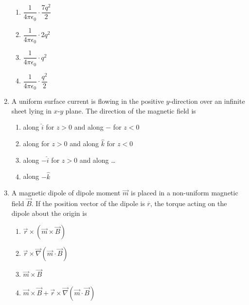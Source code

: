 \documentclass[journal,12pt,onecolumn]{IEEEtran}
\begin{document}
\begin{enumerate}
\hfill{}

\begin{multicols}{4}
\begin{enumerate}
    \item $\dfrac{1}{4\pi\epsilon_{0}} \cdot \dfrac{7q^{2}}{2}$
    \item $\dfrac{1}{4\pi\epsilon_{0}} \cdot 2q^{2}$
    \item $\dfrac{1}{4\pi\epsilon_{0}} \cdot q^{2}$
    \item $\dfrac{1}{4\pi\epsilon_{0}} \cdot \dfrac{q^{2}}{2}$
\end{enumerate}
\end{multicols}

\item A uniform surface current is flowing in the positive $y$-direction over an infinite sheet lying in $x$-$y$ plane. The direction of the magnetic field is  

\hfill{}

\begin{multicols}{2}
\begin{enumerate}
    \item along $\hat{i}$ for $z > 0$ and along $-$ for $z < 0$
    \item along for $z > 0$ and along $\hat{k}$ for $z < 0$
    \item along $-\hat{i}$ for $z > 0$ and along \dots
    \item along $-\hat{k}$
\end{enumerate}
\end{multicols}

\item A magnetic dipole of dipole moment $\vec{m}$ is placed in a non-uniform magnetic field $\vec{B}$. If the position vector of the dipole is $\overline{r}$, the torque acting on the dipole about the origin is  

\hfill{}

\begin{multicols}{2}
\begin{enumerate}
    \item $\vec{r} \times (\vec{m} \times \vec{B})$
    \item $\vec{r} \times \vec{\nabla} (\vec{m} \cdot \vec{B})$
    \item $\vec{m} \times \vec{B}$
    \item $\vec{m} \times \vec{B} + \vec{r} \times \vec{\nabla} (\vec{m} \cdot \vec{B})$
\end{enumerate}
\end{multicols}


\end{enumerate}
\end{document}
